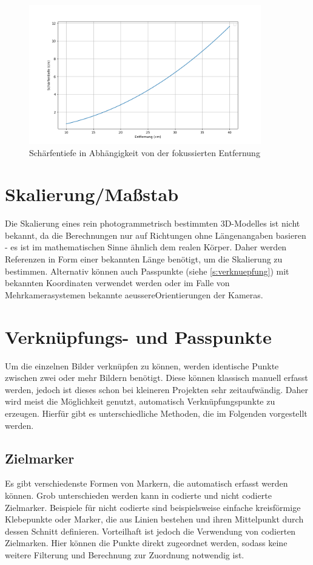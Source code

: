 \documentclass[./00PhotoBox.tex]{subfiles}
\begin{document}
\begin{figure}
    \centering
    \includegraphics[width=0.9\textwidth]{./img/2_grundlagen/schaerfentiefe_plot.png}
    \caption{Schärfentiefe in Abhängigkeit von der fokussierten Entfernung} %
    \label{img:sschaerfentiefe_plot} %
\end{figure}


\section{Skalierung/Maßstab}
\label{sec:massstab}
Die Skalierung eines rein photogrammetrisch bestimmten 3D-Modelles ist nicht bekannt, da die Berechnungen nur auf Richtungen ohne Längenangaben basieren - es ist im mathematischen Sinne ähnlich dem realen Körper. Daher werden Referenzen in Form einer bekannten Länge benötigt, um die Skalierung zu bestimmen. Alternativ können auch Passpunkte (siehe \autoref{s:verknuepfung}) mit bekannten Koordinaten verwendet werden oder im Falle von Mehrkamerasystemen bekannte \gls{aeussereOrientierung}en der Kameras. \citep[S. 546]{luhmann}


\section{Verknüpfungs- und Passpunkte}
\label{s:verknuepfung}
Um die einzelnen Bilder verknüpfen zu können, werden identische Punkte zwischen zwei oder mehr Bildern benötigt. Diese können klassisch manuell erfasst werden, jedoch ist dieses schon bei kleineren Projekten sehr zeitaufwändig. Daher wird meist die Möglichkeit genutzt, automatisch Verknüpfungspunkte zu erzeugen. Hierfür gibt es unterschiedliche Methoden, die im Folgenden vorgestellt werden.


\subsection{Zielmarker}
Es gibt verschiedenste Formen von Markern, die automatisch erfasst werden können. Grob unterschieden werden kann in codierte und nicht codierte Zielmarker. Beispiele für nicht codierte sind beispielsweise einfache kreisförmige Klebepunkte oder Marker, die aus Linien bestehen und ihren Mittelpunkt durch dessen Schnitt definieren.
Vorteilhaft ist jedoch die Verwendung von codierten Zielmarken. Hier können die Punkte direkt zugeordnet werden, sodass keine weitere Filterung und Berechnung zur Zuordnung notwendig ist. \citep[S.535ff]{luhmann}
\end{document}
